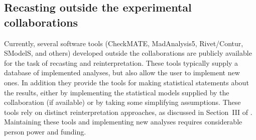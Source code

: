 \documentclass[11pt]{article}
\begin{document}
\subsection{Recasting outside the experimental collaborations}




Currently, several software tools (CheckMATE, MadAnalysis5, Rivet/Contur, SModelS, and others) developed outside the collaborations are publicly available for the task of recasting and reinterpretation. These tools typically supply a database of implemented analyses, but also allow the user to implement new ones.
In addition they provide the tools for making statistical statements about the results, either by implementing the statistical models supplied by the collaboration (if available) or by taking some simplifying assumptions.
These tools rely on distinct reinterpretation approaches, as discussed in Section~III of \cite{LHCReinterpretationForum:2020xtr}.
Maintaining these tools and implementing new analyses requires considerable person power and funding.
\end{document}
